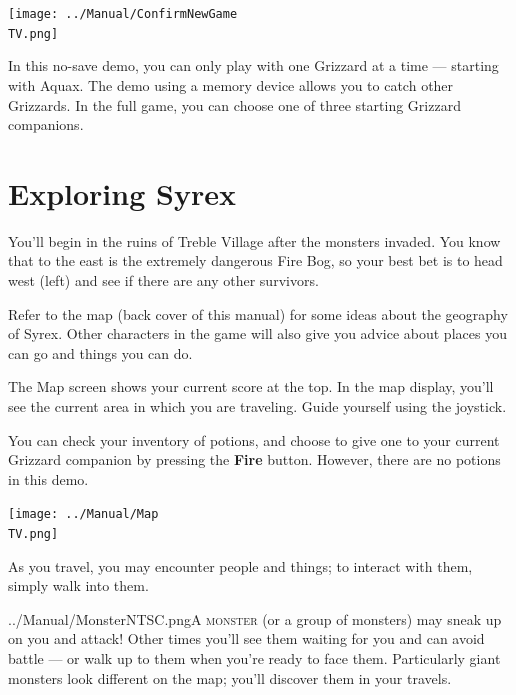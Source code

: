 \documentclass[10pt,twocolumn,openany,article]{memoir}
\newcommand\TV{NTSC}
\newcommand\TV{PAL}
\newcommand\TV{SECAM}
\begin{document}
\begin{center}
  \texttt{[image: ../Manual/ConfirmNewGame\\TV.png]}
\end{center}

\fi
\fi
\ifdefined\NOSAVE

In this no-save demo, you can only  play with one Grizzard at a time ---
starting with Aquax. The demo using  a memory device allows you to catch
other Grizzards. In the full game,  you can choose one of three starting
Grizzard companions.

\fi

\section{Exploring Syrex}

You'll begin in the ruins of  Treble Village after the monsters invaded.
You know that to  the east is the extremely dangerous  Fire Bog, so your
best  bet   is  to  head   west  (left)  and   see  if  there   are  any
other survivors.

Refer to the  map (back cover of  this manual) for some  ideas about the
geography of  Syrex. Other  characters in  the game  will also  give you
advice about places you can go and things you can do.

The Map screen shows your current score  at the top. In the map display,
you'll see the  current area in which you are  traveling. Guide yourself
using the joystick.

You can check your inventory of potions,  and choose to give one to your
current  Grizzard  companion  by   pressing  the  \textbf{Fire}  button.
\ifdefined\DEMO However, there are no potions in this demo. \fi

\begin{center}
  \texttt{[image: ../Manual/Map\\TV.png]}
\end{center}

As you  travel, you may  encounter people  and things; to  interact with
them, simply walk into them.

\lettrine[image=true,                lines=5,               findent=3pt,
nindent=3pt]{../Manual/Monster\TV.png}{A   monster}  (or   a  group   of
monsters) may  sneak up on you  and attack! Other times  you'll see them
waiting for you and can avoid battle  --- or walk up to them when you're
ready to  face them. Particularly  giant monsters look different  on the
map; you'll discover them in your travels.
\end{document}
